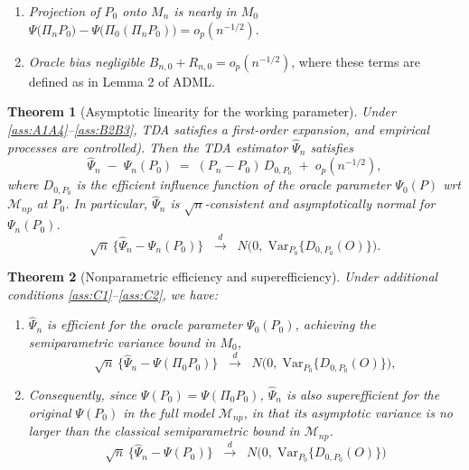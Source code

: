 \documentclass{article}
\newtheorem{theorem}{Theorem}[section]
\theoremstyle{remark}
\newcommand{\Var}{\mathrm{Var}}
\begin{document}
\begin{enumerate}[leftmargin=1.5em,label=\textbf{(C\arabic*)}]
  \item\label{ass:C1}
        \emph{Projection of $P_0$ onto $M_n$ is nearly in $M_0$}  
        $\Psi\!\bigl(\Pi_nP_0\bigr)-\Psi\!\bigl(\Pi_0(\Pi_nP_0)\bigr)=o_p(n^{-1/2})$.
  \item\label{ass:C2}
        \emph{Oracle bias negligible}  
        $B_{n,0}+R_{n,0}=o_p(n^{-1/2})$, where these terms are defined as
        in Lemma 2 of ADML.
\end{enumerate}

\begin{theorem}[Asymptotic linearity for the working parameter]
\label{thm:AL-working}
Under \ref{ass:A1A4}–\ref{ass:B2B3}, TDA satisfies a first-order expansion, and empirical processes are controlled).  Then the TDA estimator $\widehat{\Psi}_n$ satisfies
\[
   \widehat{\Psi}_n 
   \;-\;
   \Psi_n(P_0)
   \;=\;
   (P_n - P_0)\,D_{0,P_0}
   \;+\;
   o_p(n^{-1/2}),
\]
where $D_{0,P_0}$ is the efficient influence function of the \emph{oracle} parameter $\Psi_0(P)$ wrt $\mathcal{M}_{np}$ at $P_0$.  In particular, $\widehat{\Psi}_n$ is $\sqrt{n}$-consistent and asymptotically normal for $\Psi_n(P_0)$.
\[
  \sqrt{n}\,\bigl\{\hat\Psi_n-\Psi_n(P_0)\bigr\}
  \;\;\xrightarrow{d}\;\;
  N\!\bigl(0,\;\Var_{P_0}\!\{D_{0,P_0}(O)\}\bigr).
\]
\end{theorem}

\begin{theorem}[Nonparametric efficiency and superefficiency]
\label{thm:efficiency}
Under additional conditions \ref{ass:C1}–\ref{ass:C2}, we have:
\begin{enumerate}[itemsep=0pt,topsep=0pt,label=(\roman*)]
  \item $\widehat{\Psi}_n$ is \emph{efficient} for the oracle parameter $\Psi_0(P_0)$, achieving the semiparametric variance bound in $M_0$,
  \[
  \sqrt{n}\,\bigl\{\hat\Psi_n-\Psi(\Pi_0P_0)\bigr\}
  \;\;\xrightarrow{d}\;\;
  N\!\bigl(0,\;\Var_{P_0}\!\{D_{0,P_0}(O)\}\bigr),
\]
  \item Consequently, since $\Psi(P_0)=\Psi(\Pi_0P_0)$, $\widehat{\Psi}_n$ is also \emph{superefficient} for the original $\Psi(P_0)$ in the full model $\mathcal{M}_{np}$, in that its asymptotic variance is no larger than the classical semiparametric bound in $\mathcal{M}_{np}$.
\[
  \sqrt{n}\,\bigl\{\hat\Psi_n-\Psi(P_0)\bigr\}
  \;\;\xrightarrow{d}\;\;
  N\!\bigl(0,\;\Var_{P_0}\!\{D_{0,P_0}(O)\}\bigr)
\]
\end{enumerate}
\end{theorem}
\end{document}
